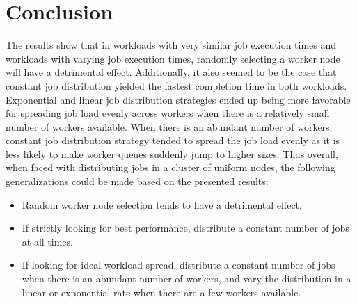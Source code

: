 \documentclass{article}
\begin{document}
\section{Conclusion} \label{conclusion}
The results show that in workloads with very similar job execution times and workloads with varying job execution times, randomly selecting a worker node will have a detrimental effect. Additionally, it also seemed to be the case that constant job distribution yielded the fastest completion time in both workloads. Exponential and linear job distribution strategies ended up being more favorable for spreading job load evenly across workers when there is a relatively small number of workers available. When there is an abundant number of workers, constant job distribution strategy tended to spread the job load evenly as it is less likely to make worker queues suddenly jump to higher sizes. Thus overall, when faced with distributing jobs in a cluster of uniform nodes, the following generalizations could be made based on the presented results:
\begin{itemize}
  \item Random worker node selection tends to have a detrimental effect.
  \item If strictly looking for best performance, distribute a constant number of jobs at all times.
  \item If looking for ideal workload spread, distribute a constant number of jobs when there is an abundant number of workers, and vary the distribution in a linear or exponential rate when there are a few workers available.

\end{itemize}




\end{document}
